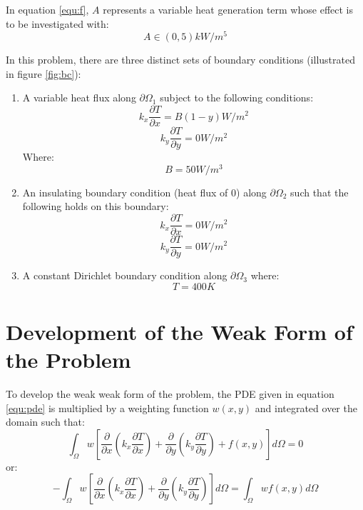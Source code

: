 \documentclass[letterpaper,10pt]{article}
\begin{document}
In equation \ref{equ:f}, $A$ represents a variable heat generation term whose effect is to be investigated with:
\[A \in \unit{(0, 5)}{kW/m^5}\]

In this problem, there are three distinct sets of boundary conditions (illustrated in figure \ref{fig:bc}):
\begin{enumerate}
	\item A variable heat flux along $\partial \Omega_1$ subject to the following conditions:
	\[k_x\frac{\partial T}{\partial x} = B \left(1-y\right) \unit{}{W/m^2}\]
	\[k_y\frac{\partial T}{\partial y} = 0 \unit{}{W/m^2}\]
	Where:
	\[B = \unit{50}{W/m^3}\]
	
	\item An insulating boundary condition (heat flux of 0) along $\partial \Omega_2$ such that the following holds on this boundary:
	\[k_x\frac{\partial T}{\partial x} = 0 \unit{}{W/m^2}\]
	\[k_y\frac{\partial T}{\partial y} = 0 \unit{}{W/m^2}\]
	
	\item A constant Dirichlet boundary condition along $\partial \Omega_3$ where:
	\[T = \unit{400}{K}\]
\end{enumerate}

\section{Development of the Weak Form of the Problem}
To develop the weak weak form of the problem, the PDE given in equation \ref{equ:pde} is multiplied by a weighting function $w(x,y)$ and integrated over the domain such that:
\[\int_\Omega w \left[\frac{\partial}{\partial x}\left(k_x\frac{\partial T}{\partial x}\right) + \frac{\partial}{\partial y}\left(k_y\frac{\partial T}{\partial y}\right) + f(x,y)\right] d\Omega = 0\]
\noindent or:
\begin{equation}
\label{equ:wintpde}
-\int_\Omega w \left[\frac{\partial}{\partial x}\left(k_x\frac{\partial T}{\partial x}\right) + \frac{\partial}{\partial y}\left(k_y\frac{\partial T}{\partial y}\right)\right] d\Omega = \int_\Omega wf(x,y)d\Omega
\end{equation}
\end{document}
